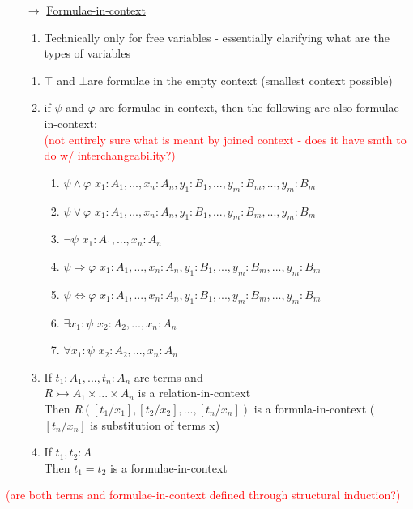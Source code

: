\documentclass{article}
\begin{document}
\begin{itemize}
  \item[$\rightarrow$] \underline{Formulae-in-context}
  \begin{enumerate}
    \item Technically only for free variables - essentially clarifying what are the types of variables
  \end{enumerate}
  \begingroup
    \renewcommand\labelenumi{(\theenumi)}
    \begin{enumerate}
      \item $\top$ and $\bot$are formulae in the empty context (smallest context possible) 
      \item if $\psi$ and $\varphi$ are formulae-in-context, then the following are also formulae-in-context: \\ {\textcolor{red}{(not entirely sure what is meant by joined context - does it have smth to do w/ interchangeability?)}}
      \begin{enumerate}
        \item $\psi \wedge \varphi$ \qquad $x_1:A_1,...,x_n:A_n,y_1:B_1,...,y_m:B_m,...,y_m:B_m$
        \item $\psi \vee \varphi$ \qquad $x_1:A_1,...,x_n:A_n,y_1:B_1,...,y_m:B_m,...,y_m:B_m$
        \item $\neg \psi$ \quad \qquad $x_1:A_1,...,x_n:A_n$
        \item $\psi \Rightarrow \varphi$ \qquad $x_1:A_1,...,x_n:A_n,y_1:B_1,...,y_m:B_m,...,y_m:B_m$
        \item $\psi \Leftrightarrow \varphi$ \qquad $x_1:A_1,...,x_n:A_n,y_1:B_1,...,y_m:B_m,...,y_m:B_m$
        \item $\exists x_1: \psi$ \quad \quad $x_2:A_2,...,x_n:A_n$
        \item $\forall x_1: \psi$ \qquad $x_2:A_2,...,x_n:A_n$
      \end{enumerate}
      \item If $t_1:A_1, ..., t_n:A_n$ are terms and \\ $R \rightarrowtail A_1 \times ... \times A_n$ is a relation-in-context \\ Then $R([t_1/x_1],[t_2/x_2],...,[t_n/x_n])$ is a formula-in-context ($[t_n/x_n]$ is substitution of terms x)
      \item If $t_1,t_2:A$ \\ Then $t_1=t_2$ is a formulae-in-context
    \end{enumerate}
  \endgroup
\end{itemize}
{\textcolor{red}{(are both terms and formulae-in-context defined through structural induction?)}}
\end{document}
